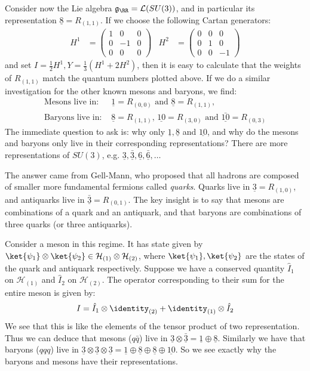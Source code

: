 \documentclass{jknotes}
\begin{document}
Consider now the Lie algebra \(\mathfrak{g}_\RR=\mathcal{L}(SU(3))\), and in particular its representation \(\underline{8} = R_{(1,1)}\). If we choose the following Cartan generators:
\begin{align}
    H^1 &=
    \begin{pmatrix}
        1 & 0 & 0 \\
        0 & -1 & 0 \\
        0 & 0 & 0
    \end{pmatrix}
    &
    H^2 &=
    \begin{pmatrix}
        0 & 0 & 0 \\
        0 & 1 & 0 \\
        0 & 0 & -1
    \end{pmatrix}
\end{align}
and set \(I = \frac{1}{2}H^1, Y= \frac{1}{3}(H^1+2H^2)\), then it is easy to calculate that the weights of \(R_{(1,1)}\) match the quantum numbers plotted above. If we do a similar investigation for the other known mesons and baryons, we find:
\begin{align}
    \text{Mesons live in: }& \underline{1}=R_{(0,0)} \text{ and } \underline{8}=R_{(1,1)} \text{,}\\
    \text{Baryons live in: }& \underline{8}=R_{(1,1)} \text{, } \underline{10}=R_{(3,0)} \text{ and } \underline{\bar{10}}=R_{(0,3)}
\end{align}
The immediate question to ask is: why only \(\underline{1},\underline{8}\) and \(\underline{10}\), and why do the mesons and baryons only live in their corresponding representations? There are more representations of \(SU(3)\), e.g. \(\underline{3},\underline{\bar{3}}, \underline{6}, \underline{\bar{6}}, \dots\)

The answer came from Gell-Mann, who proposed that all hadrons are composed of smaller more fundamental fermions called \emph{quarks}. Quarks live in \(\underline{3} = R_{(1,0)}\), and antiquarks live in \(\underline{\bar{3}} = R_{(0,1)}\). The key insight is to say that mesons are combinations of a quark and an antiquark, and that baryons are combinations of three quarks (or three antiquarks). 

Consider a meson in this regime. It has state given by \(\ket{\psi_1}\otimes\ket{\psi_2} \in \mathcal{H}_{(1)}\otimes \mathcal{H}_{(2)}\), where \(\ket{\psi_1},\ket{\psi_2}\) are the states of the quark and antiquark respectively. Suppose we have a conserved quantity \(\hat{I}_1\) on \(\mathcal{H}_{(1)}\) and \(\hat{I}_2\) on \(\mathcal{H}_{(2)}\). The operator corresponding to their sum for the entire meson is given by:
\begin{equation}
    I = \hat{I}_1 \otimes \identity_{(2)} + \identity_{(1)} \otimes \hat{I}_2
\end{equation}
We see that this is like the elements of the tensor product of two representation. Thus we can deduce that mesons (\(q\bar{q}\)) live in \(\underline{3}\otimes\underline{\bar{3}} = \underline{1} \oplus \underline{8}\). Similarly we have that baryons (\(qqq\)) live in \(\underline{3}\otimes\underline{3}\otimes\underline{3} = \underline{1}\oplus\underline{8}\oplus\underline{8}\oplus\underline{10}\). So we see exactly why the baryons and mesons have their representations.
\end{document}
